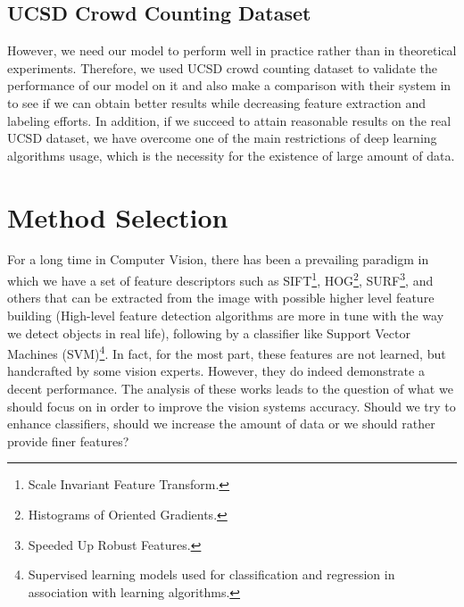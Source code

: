 \subsection{UCSD Crowd Counting Dataset}

However, we need our model to perform well in practice rather than in theoretical experiments. Therefore, we used UCSD crowd counting dataset \cite{chan2008privacy} to validate the performance of our model on it and also make a comparison with their system in \cite{chan2008privacy} to see if we can obtain better results while decreasing feature extraction and labeling efforts. In addition, if we succeed to attain reasonable results on the real UCSD dataset, we have overcome one of the main restrictions of deep learning algorithms usage, which is the necessity for the existence of large amount of data.     


\section{Method Selection}

For a long time in Computer Vision, there has been a prevailing paradigm in which we have a set of feature descriptors such as SIFT\footnote{Scale Invariant Feature Transform.}, HOG\footnote{Histograms of Oriented Gradients.}, SURF\footnote{Speeded Up Robust Features.}, and others that can be extracted from the image with possible higher level feature building (High-level feature detection algorithms are more in tune with the way we detect objects in real life), following by a classifier like Support Vector Machines (SVM)\footnote{Supervised learning models used for classification and regression in association with learning algorithms.}. In fact, for the most part, these features are not learned, but handcrafted by some vision experts. However, they do indeed demonstrate a decent performance\cite{felzenszwalb2010object, yu2010object}. The analysis of these works leads to the question of what we should focus on in order to improve the vision systems accuracy. Should we try to enhance classifiers, should we increase the amount of data or we should rather provide finer features?
 
